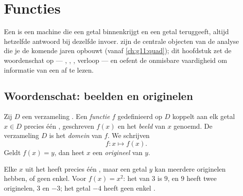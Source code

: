 \chapter{Functies}\label{ch:g10:functions}

Een  is een machine die een getal binnenkrijgt en een getal
teruggeeft, altijd hetzelfde antwoord bij dezelfde invoer.  zijn de
centrale objecten van de analyse die je de komende jaren opbouwt (vanaf
\cref{ch:g11:quad}); dit hoofdstuk zet de woordenschat op --- , ,
, verloop --- en oefent de onmisbare vaardigheid om informatie van een
 af te lezen.

\section{Woordenschat: beelden en originelen}

\begin{definition}[Functie]\label{def:g10:functions:function}
Zij $D$ een verzameling . Een \emph{functie} $f$
gedefinieerd op $D$ koppelt aan elk getal $x \in D$ precies één ,
geschreven $f(x)$ en het \emph{beeld} van $x$ genoemd. De
verzameling $D$ is het \emph{domein} van $f$. We schrijven
\[
f : x \longmapsto f(x).
\]
Geldt $f(x) = y$, dan heet $x$ een \emph{origineel} van $y$.
\end{definition}

\begin{remark}
Elke $x$ uit het  heeft precies één , maar een getal $y$ kan
meerdere originelen hebben, of geen enkel. Voor $f(x) = x^2$: het  van
$3$ is $9$, en $9$ heeft twee originelen, $3$ en $-3$; het getal $-4$ heeft
geen enkel .
\end{remark}

